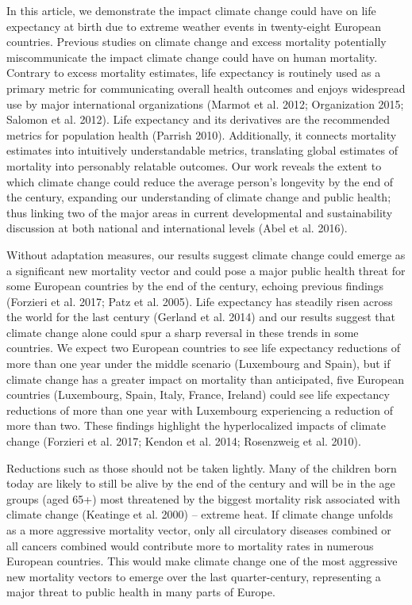 \documentclass[12pt,]{article}
\begin{document}
In this article, we demonstrate the impact climate change could have on
life expectancy at birth due to extreme weather events in twenty-eight
European countries. Previous studies on climate change and excess
mortality potentially miscommunicate the impact climate change could
have on human mortality. Contrary to excess mortality estimates, life
expectancy is routinely used as a primary metric for communicating
overall health outcomes and enjoys widespread use by major international
organizations (Marmot et al. 2012; Organization 2015; Salomon et al.
2012). Life expectancy and its derivatives are the recommended metrics
for population health (Parrish 2010). Additionally, it connects
mortality estimates into intuitively understandable metrics, translating
global estimates of mortality into personably relatable outcomes. Our
work reveals the extent to which climate change could reduce the average
person's longevity by the end of the century, expanding our
understanding of climate change and public health; thus linking two of
the major areas in current developmental and sustainability discussion
at both national and international levels (Abel et al. 2016).

Without adaptation measures, our results suggest climate change could
emerge as a significant new mortality vector and could pose a major
public health threat for some European countries by the end of the
century, echoing previous findings (Forzieri et al. 2017; Patz et al.
2005). Life expectancy has steadily risen across the world for the last
century (Gerland et al. 2014) and our results suggest that climate
change alone could spur a sharp reversal in these trends in some
countries. We expect two European countries to see life expectancy
reductions of more than one year under the middle scenario (Luxembourg
and Spain), but if climate change has a greater impact on mortality than
anticipated, five European countries (Luxembourg, Spain, Italy, France,
Ireland) could see life expectancy reductions of more than one year with
Luxembourg experiencing a reduction of more than two. These findings
highlight the hyperlocalized impacts of climate change (Forzieri et al.
2017; Kendon et al. 2014; Rosenzweig et al. 2010).

Reductions such as those should not be taken lightly. Many of the
children born today are likely to still be alive by the end of the
century and will be in the age groups (aged 65+) most threatened by the
biggest mortality risk associated with climate change (Keatinge et al.
2000) -- extreme heat. If climate change unfolds as a more aggressive
mortality vector, only all circulatory diseases combined or all cancers
combined would contribute more to mortality rates in numerous European
countries. This would make climate change one of the most aggressive new
mortality vectors to emerge over the last quarter-century, representing
a major threat to public health in many parts of Europe.
\end{document}
